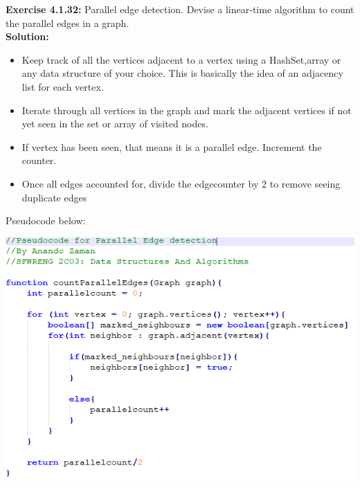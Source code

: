 \documentclass[11pt,fleqn]{article}
\begin{document}
\textbf{Exercise 4.1.32:} Parallel edge detection. Devise a linear-time algorithm to count the parallel
edges in a graph.\\

\textbf{Solution:}
\begin{itemize}
	\item Keep track of all the vertices adjacent to a vertex using a HashSet,array or any data structure of your choice. This is basically the idea of an adjacency list for each vertex.
	
	\item Iterate through all vertices in the graph and mark the adjacent vertices if not yet seen in the set or array of visited nodes.
	
	\item If vertex has been seen, that means it is a parallel edge. Increment the counter.
	
	\item Once all edges accounted for, divide the edgecounter by 2 to remove seeing duplicate edges
\end{itemize}

Pseudocode below:

\begin{center}
	\includegraphics[scale=1]{4.1.32.png}
\end{center}
\end{document}

